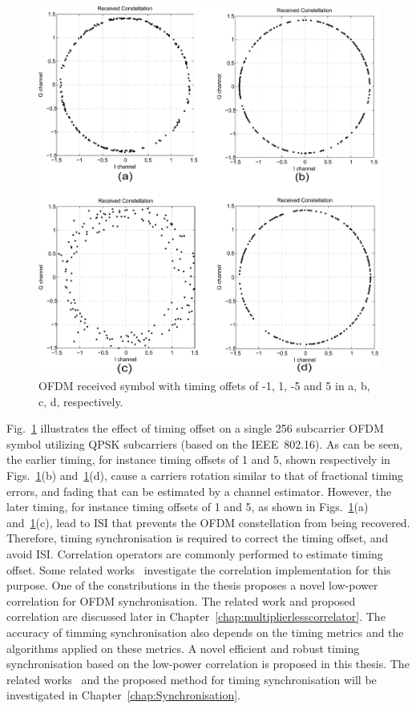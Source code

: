 \begin{figure}
	\centerline{\includegraphics [width=0.8\columnwidth] {Figures/timeoff.pdf} }
	\caption{OFDM received symbol with timing offets of -1, 1, -5 and 5 in a, b, c, d, respectively.}
	\label{fig:Timingoffsetconstellation}
\end{figure}

Fig.~\ref{fig:Timingoffsetconstellation} illustrates the effect of timing offset on a single 256 subcarrier OFDM symbol utilizing QPSK subcarriers (based on the IEEE~802.16).
As can be seen, the earlier timing, for instance timing offsets of 1 and 5, shown respectively in Figs.~\ref{fig:Timingoffsetconstellation}(b) and~\ref{fig:Timingoffsetconstellation}(d), cause a carriers rotation similar to that of fractional timing errors, and fading that can be estimated by a channel estimator.
However, the later timing, for instance timing offsets of 1 and 5, as shown in Figs.~\ref{fig:Timingoffsetconstellation}(a) and~\ref{fig:Timingoffsetconstellation}(c), lead to ISI that prevents the OFDM constellation from being recovered. 
Therefore, timing synchronisation is required to correct the timing offset, and avoid ISI.
Correlation operators are commonly performed to estimate timing offset. Some related works~\cite{Dick2003,Fort2003,Wang2004} investigate the correlation implementation for this purpose. One of the constributions in the thesis proposes a novel low-power correlation for OFDM synchronisation. The related work and proposed correlation are discussed later in Chapter~\ref{chap:multiplierlesscorrelator}. 
The accuracy of timming synchronisation also depends on the timing metrics and the algorithms applied on these metrics. A novel efficient and robust timing synchronisation based on the low-power correlation is proposed in this thesis. The related works~\cite{Schmidl1997,Kishore2006,Guffey2007,Huang2010,Recio2010} and the proposed method for timing synchronisation will be investigated in Chapter~\ref{chap:Synchronisation}.
